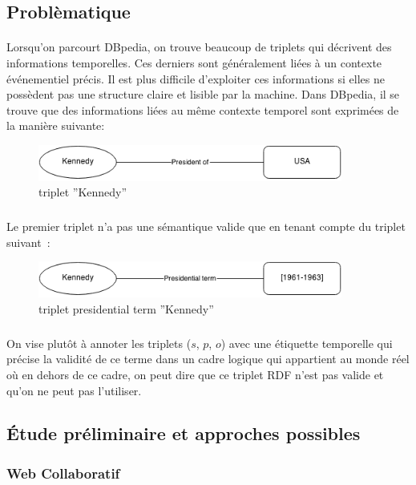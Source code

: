 \documentclass[12pt,a4	]{report}
\begin{document}
\subsection*{Problèmatique}
\paragraph{}
Lorsqu’on parcourt DBpedia, on trouve beaucoup de triplets qui décrivent des informations temporelles. Ces derniers sont généralement liées à un contexte événementiel précis.
Il est plus difficile d’exploiter ces informations si elles ne possèdent pas une structure claire et lisible par la machine.
\newline
Dans DBpedia, il se trouve que des informations liées au même contexte temporel sont exprimées de la manière suivante: 
\begin{figure}[H]
        \centering
                \centering
                \includegraphics[width=10cm]{ken.png}
               \caption{triplet ''Kennedy''}

\end{figure}
\subparagraph{}
Le premier triplet n'a pas une sémantique valide que en tenant compte du triplet suivant~: 
\begin{figure}[H]
        \centering
                \centering
                \includegraphics[width=10cm]{presidterm.png}
               \caption{triplet presidential term ''Kennedy''}

\end{figure}
\subparagraph{}
On vise plutôt à annoter les triplets ($s$, $p$, $o$) avec une étiquette temporelle qui précise la validité de ce terme dans un cadre logique qui appartient au monde réel où en dehors de ce cadre, on peut dire que ce triplet RDF n’est pas valide et qu’on ne peut pas l’utiliser.

\subsection*{Étude préliminaire et approches possibles}
\subsubsection*{Web Collaboratif}
\end{document}
